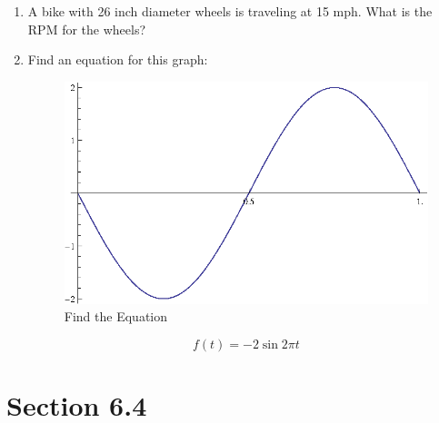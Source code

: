 \documentclass{exam}
\begin{document}
  \begin{enumerate}
    \item A bike with 26 inch diameter wheels is traveling at 15 mph.  What is the RPM for the wheels?

    \item Find an equation for this graph:
      \begin{figure}[h]
        \centering
        \includegraphics[scale=0.7]{review.eps}
        \caption{Find the Equation}
      \end{figure}

      \begin{solution}
        \[
          f(t) = -2 \sin 2 \pi t
        \]
      \end{solution}

  \end{enumerate}
  
  \ifprintanswers

    \section{Section 6.4}
\end{document}
